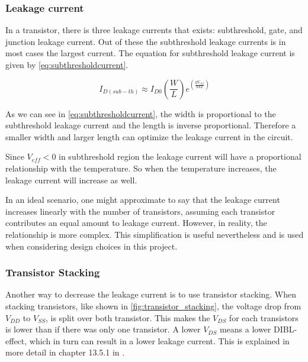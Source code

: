 \subsubsection{Leakage current}

In a transistor, there is three leakage currents that exists: subthreshold, gate, and
junction leakage current. Out of these the subthreshold leakage currents is in most cases the largest current. \cite[p.42]{Analog_integrated} The equation for subthreshold leakage current is given by \autoref{eq:subthresholdcurrent}. 

\begin{equation}
    \label{eq:subthresholdcurrent}
    I_{D(sub-th)} \approx I_{D0}\left(\frac{W}{L}\right)e^{\left(\frac{qV_{eff}}{nkT}\right)}
\end{equation}

As we can see in \autoref{eq:subthresholdcurrent}, the width is proportional to the subthreshold leakage current and the length is inverse proportional. Therefore a smaller width and larger length can optimize the leakage current in the circuit.

Since $V_{eff} < 0$ in subthreshold region the leakage current will have a proportional relationship with the temperature. So when the temperature increases, the leakage current will increase as well. 

In an ideal scenario, one might approximate to say that the leakage current increases linearly with the number of transistors, assuming each transistor contributes an equal amount to leakage current. However, in reality, the relationship is more complex. This simplification is useful nevertheless and is used when considering design choices in this project.

\subsubsection{Transistor Stacking}
Another way to decrease the leakage current is to use transistor stacking. When stacking transistors, like shown in \autoref{fig:transistor_stacking}, the voltage drop from $V_{DD}$ to $V_{SS}$, is split over both transistor. This makes the $V_{DS}$ for each transistors is lower than if there was only one transistor. A lower $V_{DS}$ means a lower DIBL-effect, which in turn can result in a lower leakage current. This is explained in more detail in chapter 13.5.1 in \cite{transistor_stacking}.


